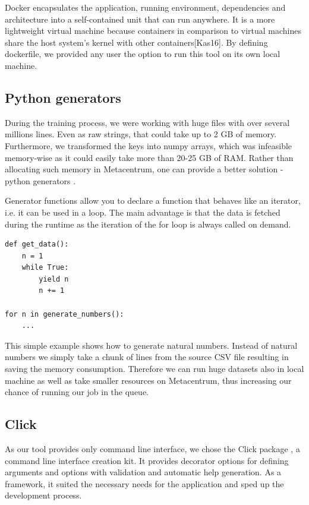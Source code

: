 Docker encapsulates the application, running environment, dependencies and architecture into a self-contained unit that can run anywhere. It is a more lightweight virtual machine because containers in comparison to virtual machines share the host system’s kernel with other containers[Kas16]. By defining dockerfile, we provided any user the option to run this tool on its own local machine.

\subsection{Python generators}

\label{python-generators}

During the training process, we were working with huge files with over several millions lines. Even as raw strings, that could take up to 2 GB of memory. Furthermore, we transformed the keys into numpy arrays, which was infeasible memory-wise as it could easily take more than 20-25 GB of RAM. Rather than allocating such memory in Metacentrum, one can provide a better solution - python generators \cite{python-gen}. 

Generator functions allow you to declare a function that behaves like an iterator, i.e. it can be used in a loop. The main advantage is that the data is fetched during the runtime as the iteration of the for loop is always called on demand.

\begin{verbatim}
def get_data():
    n = 1
    while True:
        yield n
        n += 1
		
for n in generate_numbers():
    ...
\end{verbatim}

This simple example shows how to generate natural numbers. Instead of natural numbers we simply take a chunk of lines from the source CSV file resulting in saving the memory consumption. Therefore we can run huge datasets also in local machine as well as take smaller resources on Metacentrum, thus increasing our chance of running our job in the queue.

\subsection{Click}

As our tool provides only command line interface, we chose the Click package \cite{click}, a command line interface creation kit. It provides decorator options for defining arguments and options with validation and automatic help generation. As a framework, it suited the necessary needs for the application and sped up the development process.

